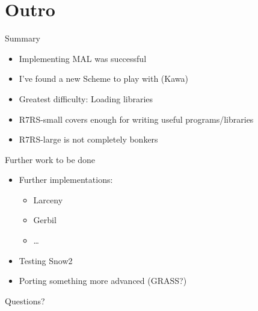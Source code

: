 \documentclass[presentation]{beamer}
\begin{document}
\section{Outro}
\label{sec-4}

\begin{frame}[label=sec-4-1]{Summary}
\begin{itemize}
\item Implementing MAL was successful
\item I've found a new Scheme to play with (Kawa)
\item Greatest difficulty: Loading libraries
\item R7RS-small covers enough for writing useful programs/libraries
\item R7RS-large is not completely bonkers
\end{itemize}
\end{frame}

\begin{frame}[label=sec-4-2]{Further work to be done}
\begin{itemize}
\item Further implementations:
\begin{itemize}
\item Larceny
\item Gerbil
\item \ldots{}
\end{itemize}
\item Testing Snow2
\item Porting something more advanced (GRASS?)
\end{itemize}
\end{frame}

\begin{frame}[label=sec-4-3]{Questions?}
\end{frame}
\end{document}
